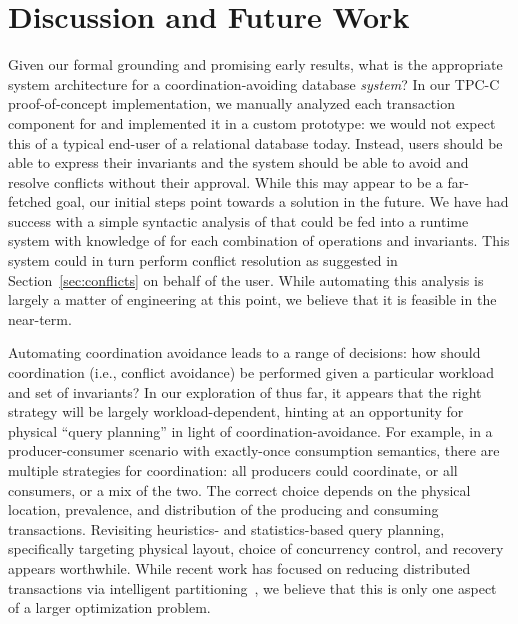 
\section{Discussion and Future Work}
\label{sec:discussion}


 Given our formal grounding
\iconfluence and promising early results, what is the appropriate
system architecture for a coordination-avoiding database
\textit{system}? In our TPC-C proof-of-concept implementation, we
manually analyzed each transaction component for \iconfluence and
implemented it in a custom prototype: we would not expect this of a
typical end-user of a relational database today. Instead, users should
be able to express their invariants and the system should be able to
avoid and resolve conflicts without their approval. While this may
appear to be a far-fetched goal, our initial steps point towards a
solution in the future. We have had success with a simple syntactic
analysis of \lang that could be fed into a runtime system with
knowledge of \iconfluence for each combination of operations and
invariants. This system could in turn perform conflict resolution as
suggested in Section~\ref{sec:conflicts} on behalf of the user. While
automating this analysis is largely a matter of engineering at this
point, we believe that it is feasible in the near-term.

 Automating coordination
avoidance leads to a range of decisions: how should coordination
(i.e., conflict avoidance) be performed given a particular workload
and set of invariants? In our exploration of \iconfluence thus far, it
appears that the right strategy will be largely workload-dependent,
hinting at an opportunity for physical ``query planning'' in light of
coordination-avoidance. For example, in a producer-consumer scenario
with exactly-once consumption semantics, there are multiple strategies
for coordination: all producers could coordinate, or all consumers, or
a mix of the two. The correct choice depends on the physical location,
prevalence, and distribution of the producing and consuming
transactions. Revisiting heuristics- and statistics-based query
planning, specifically targeting physical layout, choice of
concurrency control, and recovery appears worthwhile. While recent
work has focused on reducing distributed transactions via intelligent
partitioning~\cite{schism}, we believe that this is only one aspect of a larger
optimization problem.

